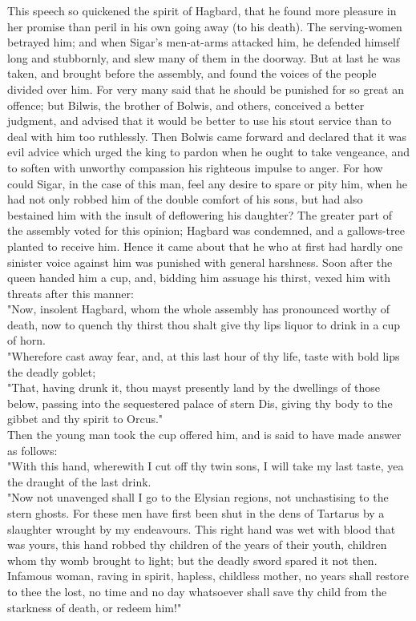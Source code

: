\documentclass[10pt,a4paper]{report}
\begin{document}
This speech so quickened the spirit of Hagbard, that he found more pleasure in her promise than peril in his own going away (to his death). The serving-women betrayed him; and when Sigar's men-at-arms attacked him, he defended himself long and stubbornly, and slew many of them in the doorway. But at last he was taken, and brought before the assembly, and found the voices of the people divided over him. For very many said that he should be punished for so great an offence; but Bilwis, the brother of Bolwis, and others, conceived a better judgment, and advised that it would be better to use his stout service than to deal with him too ruthlessly. Then Bolwis came forward and declared that it was evil advice which urged the king to pardon when he ought to take vengeance, and to soften with unworthy compassion his righteous impulse to anger. For how could Sigar, in the case of this man, feel any desire to spare or pity him, when he had not only robbed him of the double comfort of his sons, but had also bestained him with the insult of deflowering his daughter? The greater part of the assembly voted for this opinion; Hagbard was condemned, and a gallows-tree planted to receive him. Hence it came about that he who at first had hardly one sinister voice against him was punished with general harshness. Soon after the queen handed him a cup, and, bidding him assuage his thirst, vexed him with threats after this manner:\\

"Now, insolent Hagbard, whom the whole assembly has pronounced worthy of death, now to quench thy thirst thou shalt give thy lips liquor to drink in a cup of horn.\\

"Wherefore cast away fear, and, at this last hour of thy life, taste with bold lips the deadly goblet;\\

"That, having drunk it, thou mayst presently land by the dwellings of those below, passing into the sequestered palace of stern Dis, giving thy body to the gibbet and thy spirit to Orcus."\\

Then the young man took the cup offered him, and is said to have made answer as follows:\\

"With this hand, wherewith I cut off thy twin sons, I will take my last taste, yea the draught of the last drink.\\

"Now not unavenged shall I go to the Elysian regions, not unchastising to the stern ghosts. For these men have first been shut in the dens of Tartarus by a slaughter wrought by my endeavours. This right hand was wet with blood that was yours, this hand robbed thy children of the years of their youth, children whom thy womb brought to light; but the deadly sword spared it not then. Infamous woman, raving in spirit, hapless, childless mother, no years shall restore to thee the lost, no time and no day whatsoever shall save thy child from the starkness of death, or redeem him!"\\
\end{document}
